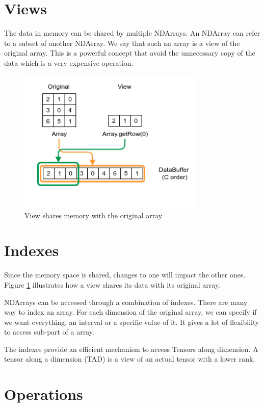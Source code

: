 \section{Views}

The data in memory can be shared by multiple NDArrays. An NDArray can refer to a subset of another NDArray. We say that such an array is a view of the original array. This is a powerful concept that avoid the unnecessary copy of the data which is a very expensive operation.



\begin{figure}[h]
	\begin{center}
		\includegraphics[width=3.5in]{images/views.png} 

		\caption{View shares memory with the original array}
	\end{center}
	\label{fig:sharememView}
\end{figure}
\section{Indexes}
Since the memory space is shared, changes to one will impact the other ones. Figure \ref{fig:sharememView} illustrates how a view shares its data with its original array.

NDArrays can be accessed through a combination of indexes. There are many way to index an array. For each dimension of the original array, we can specify if we want everything, an interval or a specific value of it. It gives a lot of flexibility to access sub-part of a array. 
 
The indexes provide an efficient mechanism to access Tensors along dimension. A tensor along a dimension (TAD) is a view of an actual tensor with a lower rank.

\section{Operations}

